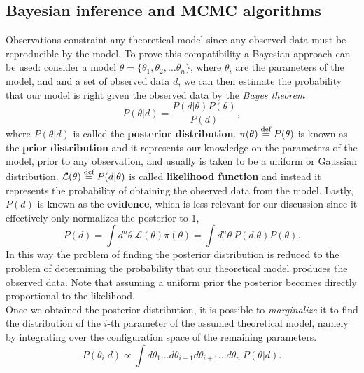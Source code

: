 \subsection{Bayesian inference and MCMC algorithms}
Observations constraint any theoretical model since any observed data must be reproducible by the model. To prove this compatibility a Bayesian approach can be used: consider a model $\theta=\{\theta_1,\theta_2,\dots\theta_n\}$, where $\theta_i$ are the parameters of the model, and and a set of observed data $d$, we can then estimate the probability that our model is right given the observed data by the \emph{Bayes theorem}
\begin{equation}
    P(\theta|d)=\frac{P(d|\theta)P(\theta)}{P(d)},
\end{equation}
where $P(\theta|d)$ is called the \textbf{posterior distribution}. $\pi(\theta)\stackrel{\text{def}}{=} P(\theta)$ is known as the \textbf{prior distribution} and it represents our knowledge on the parameters of the model, prior to any observation, and usually is taken to be a uniform or Gaussian distribution.  $\mathcal{L}(\theta)\stackrel{\text{def}}{=} P(d|\theta)$ is called \textbf{likelihood function} and instead it represents the probability of obtaining the observed data from the model. Lastly, $P(d)$ is known as the \textbf{evidence}, which is less relevant for our discussion since it effectively only normalizes the posterior to 1, 
$$P(d)=\int d^n\theta\ \mathcal{L}(\theta)\pi(\theta)=\int d^n\theta\ P(d|\theta)P(\theta).$$
In this way the problem of finding the posterior distribution is reduced to the problem of determining the probability that our theoretical model produces the observed data. Note that assuming a uniform prior the posterior becomes directly proportional to the likelihood.\\ 
Once we obtained the posterior distribution, it is possible to \emph{marginalize} it to find the distribution of the $i$-th parameter of the assumed theoretical model, namely by integrating over the configuration space of the remaining parameters.
$$P(\theta_i|d)\propto\int d\theta_1\dots d\theta_{i-1}d\theta_{i+1}\dots d\theta_n\ P(\theta|d). $$

